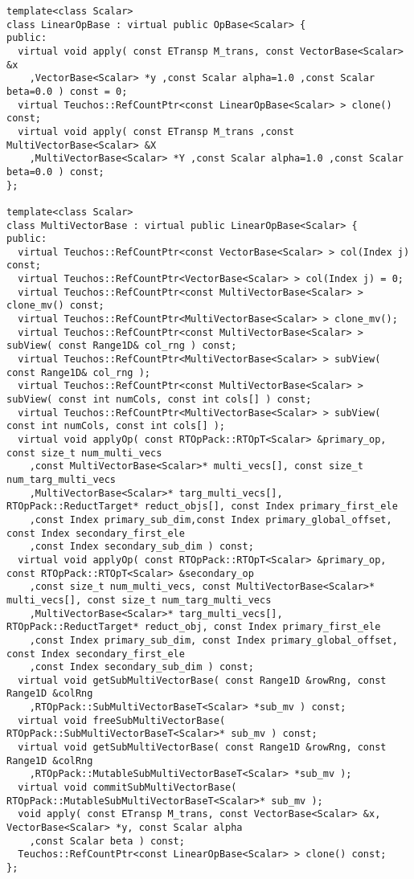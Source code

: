 {\begin{verbatim}
template<class Scalar>
class LinearOpBase : virtual public OpBase<Scalar> {
public:
  virtual void apply( const ETransp M_trans, const VectorBase<Scalar> &x
    ,VectorBase<Scalar> *y ,const Scalar alpha=1.0 ,const Scalar beta=0.0 ) const = 0;
  virtual Teuchos::RefCountPtr<const LinearOpBase<Scalar> > clone() const;
  virtual void apply( const ETransp M_trans ,const MultiVectorBase<Scalar> &X
    ,MultiVectorBase<Scalar> *Y ,const Scalar alpha=1.0 ,const Scalar beta=0.0 ) const;
};

template<class Scalar>
class MultiVectorBase : virtual public LinearOpBase<Scalar> {
public:
  virtual Teuchos::RefCountPtr<const VectorBase<Scalar> > col(Index j) const;
  virtual Teuchos::RefCountPtr<VectorBase<Scalar> > col(Index j) = 0;
  virtual Teuchos::RefCountPtr<const MultiVectorBase<Scalar> > clone_mv() const;
  virtual Teuchos::RefCountPtr<MultiVectorBase<Scalar> > clone_mv();
  virtual Teuchos::RefCountPtr<const MultiVectorBase<Scalar> > subView( const Range1D& col_rng ) const;
  virtual Teuchos::RefCountPtr<MultiVectorBase<Scalar> > subView( const Range1D& col_rng );
  virtual Teuchos::RefCountPtr<const MultiVectorBase<Scalar> > subView( const int numCols, const int cols[] ) const;
  virtual Teuchos::RefCountPtr<MultiVectorBase<Scalar> > subView( const int numCols, const int cols[] );
  virtual void applyOp( const RTOpPack::RTOpT<Scalar> &primary_op, const size_t num_multi_vecs
    ,const MultiVectorBase<Scalar>* multi_vecs[], const size_t num_targ_multi_vecs
    ,MultiVectorBase<Scalar>* targ_multi_vecs[], RTOpPack::ReductTarget* reduct_objs[], const Index primary_first_ele
    ,const Index primary_sub_dim,const Index primary_global_offset, const Index secondary_first_ele
    ,const Index secondary_sub_dim ) const;
  virtual void applyOp( const RTOpPack::RTOpT<Scalar> &primary_op, const RTOpPack::RTOpT<Scalar> &secondary_op
    ,const size_t num_multi_vecs, const MultiVectorBase<Scalar>* multi_vecs[], const size_t num_targ_multi_vecs
    ,MultiVectorBase<Scalar>* targ_multi_vecs[], RTOpPack::ReductTarget* reduct_obj, const Index primary_first_ele
    ,const Index primary_sub_dim, const Index primary_global_offset, const Index secondary_first_ele
    ,const Index secondary_sub_dim ) const;
  virtual void getSubMultiVectorBase( const Range1D &rowRng, const Range1D &colRng
    ,RTOpPack::SubMultiVectorBaseT<Scalar> *sub_mv ) const;
  virtual void freeSubMultiVectorBase( RTOpPack::SubMultiVectorBaseT<Scalar>* sub_mv ) const;
  virtual void getSubMultiVectorBase( const Range1D &rowRng, const Range1D &colRng
    ,RTOpPack::MutableSubMultiVectorBaseT<Scalar> *sub_mv );
  virtual void commitSubMultiVectorBase( RTOpPack::MutableSubMultiVectorBaseT<Scalar>* sub_mv );
  void apply( const ETransp M_trans, const VectorBase<Scalar> &x, VectorBase<Scalar> *y, const Scalar alpha
    ,const Scalar beta ) const;
  Teuchos::RefCountPtr<const LinearOpBase<Scalar> > clone() const;
};


\end{verbatim}}
